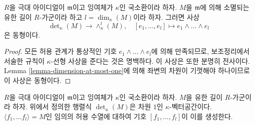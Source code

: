 \begin{lemma}
\label{lemma-compare-det}
$R$을 극대 아이디얼이 $\mathfrak m$이고 잉여체가 $\kappa$인
국소환이라 하자. $M$을 $\mathfrak m$에 의해 소멸되는 유한 길이
$R$-가군이라 하고 $l = \dim_\kappa(M)$이라 하자. 그러면 사상
$$
\det\nolimits_\kappa(M) \longrightarrow \wedge^l_\kappa(M),
\quad
[e_1, \ldots, e_l] \longmapsto e_1 \wedge \ldots \wedge e_l
$$
은 동형이다.
\end{lemma}

\begin{proof}
모든 허용 관계가 통상적인 기호
$e_1 \wedge \ldots \wedge e_l$에 의해 만족되므로, 보조정리에서
서술한 규칙이 $\kappa$-선형 사상을 준다는 것은 명백하다. 이 사상은
또한 분명히 전사이다. Lemma \ref{lemma-dimension-at-most-one}에
의해 좌변의 차원이 기껏해야 하나이므로 이 사상은 동형이다.
\end{proof}

\begin{lemma}
\label{lemma-determinant-dimension-one}
$R$을 극대 아이디얼이 $\mathfrak m$이고 잉여체가 $\kappa$인
국소환이라 하자. $M$을 유한 길이 $R$-가군이라 하자. 위에서 정의한
행렬식 $\det_\kappa(M)$은 차원 $1$인 $\kappa$-벡터공간이다.
$\langle f_1, \ldots f_l \rangle = M$인 임의의 허용 수열에 대하여
기호 $[f_1, \ldots, f_l]$이 이를 생성한다.
\end{lemma}

